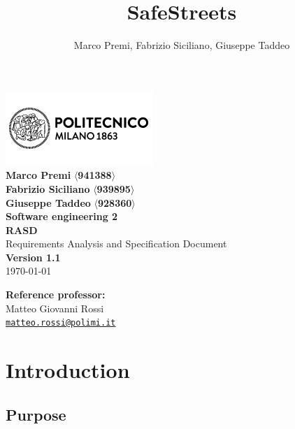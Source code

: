 \documentclass{article}
\title{SafeStreets}
\author{Marco Premi, Fabrizio Siciliano, Giuseppe Taddeo}
\begin{document}
\begin{center}
    \includegraphics[width=0.5\linewidth]{Images/logo_polimi.png}\\[4ex]
    \begingroup
        \huge \textbf{Marco Premi} $\langle$\textbf{941388}$\rangle$ \\
        \vfill
        \huge \textbf{Fabrizio Siciliano} $\langle$\textbf{939895}$\rangle$\\
        \vfill
        \huge \textbf{Giuseppe Taddeo} $\langle$\textbf{928360}$\rangle$\\
        \vfill
    \endgroup
    \vfill
    \begingroup
        \fontsize{15pt}{12pt}\selectfont
        \textbf{Software engineering 2}
    \endgroup\\[3ex]
    \begingroup
        \fontsize{20pt}{12pt}\selectfont \textbf{RASD}\\[1ex]
        \fontsize{15pt}{12pt}\selectfont Requirements Analysis and Specification
        Document \endgroup\\[8ex]
    \normalsize \textbf{Version 1.1}\\\normalsize \today\\
\end{center}

\vspace*{\fill}
\begin{flushright}
    \textbf{Reference professor:}\\[0.2cm]
    Matteo Giovanni Rossi\\[0cm]
    {\small
    \href{mailto:matteo.rossi@polimi.it}{\texttt{matteo.rossi@polimi.it}}}
\end{flushright}

\newpage
\tableofcontents

\newpage
\section{Introduction}
\subsection{Purpose}
\end{document}

